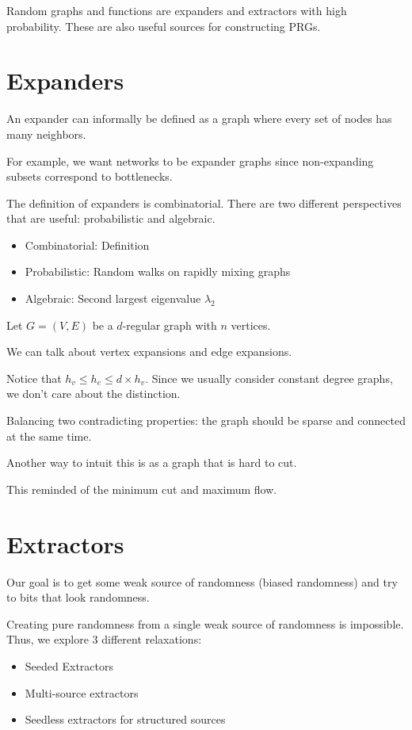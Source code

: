 \documentclass{article}
\theoremstyle{definition}
\begin{document}
\newpage

Random graphs and functions are expanders and extractors with high probability. These are also useful
sources for constructing PRGs.

\section{Expanders}

An expander can informally be defined as a graph where every set of nodes has many neighbors.

For example, we want networks to be expander graphs since non-expanding subsets correspond to bottlenecks.

The definition of expanders is combinatorial. There are two different perspectives that are useful:
probabilistic and algebraic.

\begin{itemize}
    \item Combinatorial: Definition
    \item Probabilistic: Random walks on rapidly mixing graphs
    \item Algebraic: Second largest eigenvalue $\lambda_{2}$
\end{itemize}

Let $G = (V,E)$ be a $d$-regular graph with $n$ vertices.

We can talk about vertex expansions and edge expansions.

Notice that $h_{v} \leq h_{e} \leq d \times h_{v}$. Since we usually consider
constant degree graphs, we don't care about the distinction.

Balancing two contradicting properties: the graph should be sparse and connected
at the same time.

Another way to intuit this is as a graph that is hard to cut.

This reminded of the minimum cut and maximum flow.

\newpage

\section{Extractors}

Our goal is to get some weak source of randomness (biased randomness) and try to bits that look randomness.

Creating pure randomness from a single weak source of randomness is impossible. Thus, we explore
3 different relaxations:

\begin{itemize}
    \item Seeded Extractors
    \item Multi-source extractors
    \item Seedless extractors for structured sources
\end{itemize}
\end{document}
